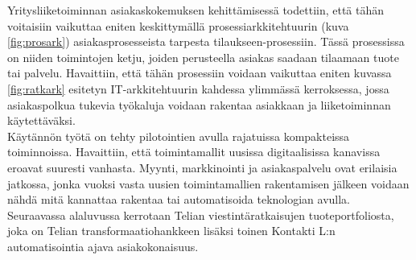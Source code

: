 \documentclass[finnish,12pt,a4paper,pdftex]{article}
\begin{document}
Yritysliiketoiminnan asiakaskokemuksen kehittämisessä todettiin, että tähän voitaisiin vaikuttaa eniten keskittymällä prosessiarkkitehtuurin (kuva \ref{fig:prosark}) asiakasprosesseista tarpesta tilaukseen-prosessiin. Tässä prosessissa on niiden toimintojen ketju, joiden perusteella asiakas saadaan tilaamaan tuote tai palvelu. Havaittiin, että tähän prosessiin voidaan vaikuttaa eniten kuvassa \ref{fig:ratkark} esitetyn IT-arkkitehtuurin kahdessa ylimmässä kerroksessa, jossa asiakaspolkua tukevia työkaluja voidaan rakentaa asiakkaan ja liiketoiminnan käytettäväksi.\\

Käytännön työtä on tehty pilotointien avulla rajatuissa kompakteissa toiminnoissa. Havaittiin, että toimintamallit uusissa digitaalisissa kanavissa eroavat suuresti vanhasta. Myynti, markkinointi ja asiakaspalvelu ovat erilaisia jatkossa, jonka vuoksi vasta uusien toimintamallien rakentamisen jälkeen voidaan nähdä mitä kannattaa rakentaa tai automatisoida teknologian avulla.\\

Seuraavassa alaluvussa kerrotaan Telian viestintäratkaisujen tuoteportfoliosta, joka on Telian transformaatiohankkeen lisäksi toinen Kontakti L:n automatisointia ajava asiakokonaisuus.



\end{document}
